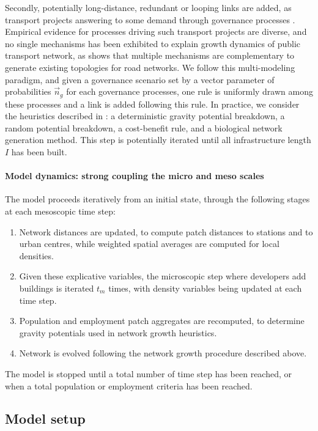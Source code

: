 \documentclass[letterpaper]{article}
\begin{document}
Secondly, potentially long-distance, redundant or looping links are added, as transport projects answering to some demand through governance processes \citep{raimbault2021introducing}. Empirical evidence for processes driving such transport projects are diverse, and no single mechanisms has been exhibited to explain growth dynamics of public transport network, as \cite{raimbault2018multi} shows that multiple mechanisms are complementary to generate existing topologies for road networks. We follow this multi-modeling paradigm, and given a governance scenario set by a vector parameter of probabilities $\vec{n}_g$ for each governance processes, one rule is uniformly drawn among these processes and a link is added following this rule. In practice, we consider the heuristics described in \cite{raimbault2018multi}: a deterministic gravity potential breakdown, a random potential breakdown, a cost-benefit rule, and a biological network generation method. This step is potentially iterated until all infrastructure length $I$ has been built.


\paragraph{Model dynamics: strong coupling the micro and meso scales}

The model proceeds iteratively from an initial state, through the following stages at each mesoscopic time step:
\begin{enumerate}
	\item Network distances are updated, to compute patch distances to stations and to urban centres, while weighted spatial averages are computed for local densities.
	\item Given these explicative variables, the microscopic step where developers add buildings is iterated $t_m$ times, with density variables being updated at each time step.
	\item Population and employment patch aggregates are recomputed, to determine gravity potentials used in network growth heuristics.
	\item Network is evolved following the network growth procedure described above.
\end{enumerate}

The model is stopped until a total number of time step has been reached, or when a total population or employment criteria has been reached.



\subsection{Model setup}
\end{document}
